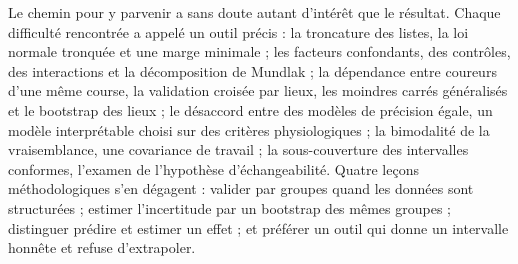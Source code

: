 \documentclass[11pt,a4paper]{article}
\begin{document}
Le chemin pour y parvenir a sans doute autant d'intérêt que le résultat. Chaque difficulté rencontrée a appelé un outil
précis : la troncature des listes, la loi normale tronquée et une marge minimale ; les facteurs confondants, des
contrôles, des interactions et la décomposition de Mundlak ; la dépendance entre coureurs d'une même course, la
validation croisée par lieux, les moindres carrés généralisés et le bootstrap des lieux ; le désaccord entre des
modèles de précision égale, un modèle interprétable choisi sur des critères physiologiques ; la bimodalité de la
vraisemblance, une covariance de travail ; la sous-couverture des intervalles conformes, l'examen de l'hypothèse
d'échangeabilité. Quatre leçons méthodologiques s'en dégagent : valider par groupes quand les données sont
structurées ; estimer l'incertitude par un bootstrap des mêmes groupes ; distinguer prédire et estimer un effet ; et
préférer un outil qui donne un intervalle honnête et refuse d'extrapoler.
\end{document}
